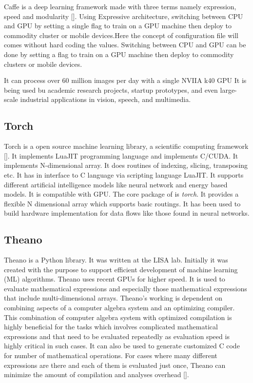 Caffe is a deep learning framework made with three terms namely
expression, speed and modularity [\cite{www-caffe}]. Using Expressive
architecture, switching between CPU and GPU by setting a single flag
to train on a GPU machine then deploy to commodity cluster or mobile
devices.Here the concept of configuration file will comes without hard
coding the values. Switching between CPU and GPU can be done by
setting a flag to train on a GPU machine then deploy to commodity
clusters or mobile devices.

It can process over 60 million images per day with a single NVIIA k40
GPU It is being used bu academic research projects, startup
prototypes, and even large-scale industrial applications in vision,
speech, and multimedia.
    
\subsection{Torch}

Torch is a open source machine learning library, a scientific
computing framework [\cite{www-torch}]. It implements LuaJIT
programming language and implements C/CUDA. It implements
N-dimensional array. It does routines of indexing, slicing,
transposing etc. It has in interface to C language via scripting
language LuaJIT. It supports different artificial intelligence models
like neural network and energy based models. It is compatible with
GPU.  The core package of is \textit{torch}. It provides a flexible N
dimensional array which supports basic routings. It has been used to
build hardware implementation for data flows like those found in
neural networks.
    
    
\subsection{Theano}
    
Theano is a Python library. It was written at the LISA lab.  Initially
it was created with the purpose to support efficient development of
machine learning (ML) algorithms.  Theano uses recent GPUs for higher
speed.  It is used to evaluate mathematical expressions and especially
those mathematical expressions that include multi-dimensional arrays.
Theano's working is dependent on combining aspects of a computer
algebra system and an optimizing compiler.  This combination of
computer algebra system with optimized compilation is highly
beneficial for the tasks which involves complicated mathematical
expressions and that need to be evaluated repeatedly as evaluation
speed is highly critical in such cases.  It can also be used to
generate customized C code for number of mathematical operations.  For
cases where many different expressions are there and each of them is
evaluated just once, Theano can minimize the amount of compilation and
analyses overhead [\cite{www-theano}].
    
